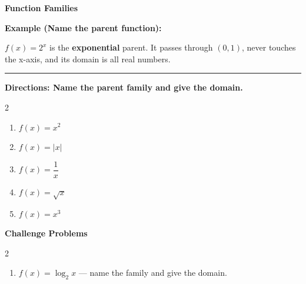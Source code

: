 \documentclass[12pt]{article}
\begin{document}
\vspace{0.35cm}

\begin{center}{\Large \textbf{Function Families}}\end{center}\vspace{0.25cm}
\textbf{Example (Name the parent function):}

$f(x)=2^{x}$ is the \textbf{exponential} parent. It passes through $(0,1)$, never touches the x-axis, and its domain is all real numbers.

\vspace{0.3cm}\hrule\vspace{0.4cm}
\textbf{Directions: Name the parent family and give the domain.}

\begin{multicols}{2}
\begin{enumerate}[label=\textbf{\arabic*.}, start=1, itemsep=2cm]
  \item $\displaystyle f(x)=x^{2}$
  \item $\displaystyle f(x)=|x|$
  \item $\displaystyle f(x)=\dfrac{1}{x}$
  \item $\displaystyle f(x)=\sqrt{x}$
  \item $\displaystyle f(x)=x^{3}$
\end{enumerate}
\end{multicols}
\newpage

\begin{center}{\large \textbf{Challenge Problems}}\end{center}\vspace{0.3cm}
\begin{multicols}{2}\begin{enumerate}[label=\textbf{\arabic*.}, start=6, itemsep=2.6cm]
  \item $f(x)=\log_{2}x$ — name the family and give the domain.
\end{enumerate}\end{multicols}\newpage
\end{document}
